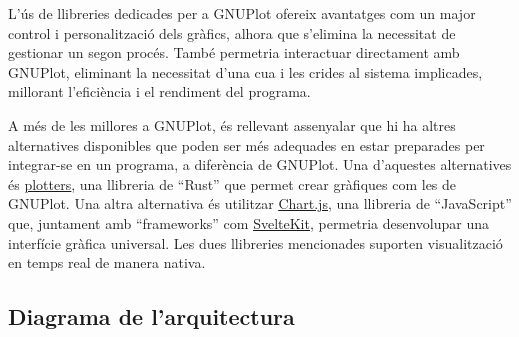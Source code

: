 \documentclass{tfgitic}[2023/06/30]
\begin{document}
L'ús de llibreries dedicades per a GNUPlot ofereix avantatges com un
major control i personalització dels gràfics, alhora que s'elimina la
necessitat de gestionar un segon procés. També permetria interactuar
directament amb GNUPlot, eliminant la necessitat d'una cua i les
crides al sistema implicades, millorant l'eficiència i el rendiment
del programa.

A més de les millores a GNUPlot, és rellevant assenyalar que hi ha
altres alternatives disponibles que poden ser més adequades en estar
preparades per integrar-se en un programa, a diferència de
GNUPlot. Una d'aquestes alternatives és
\href{https://docs.rs/plotters/latest/plotters}{\underline{plotters}},
una llibreria de ``Rust'' que permet crear gràfiques com les de
GNUPlot. Una altra alternativa és utilitzar
\href{https://www.chartjs.org/}{\underline{Chart.js}}, una llibreria
de ``JavaScript'' que, juntament amb ``frameworks'' com
\href{https://kit.svelte.dev/}{\underline{SvelteKit}}, permetria
desenvolupar una interfície gràfica universal. Les dues llibreries
mencionades suporten visualització en temps real de manera nativa.

\subsection{Diagrama de l'arquitectura}
\end{document}
